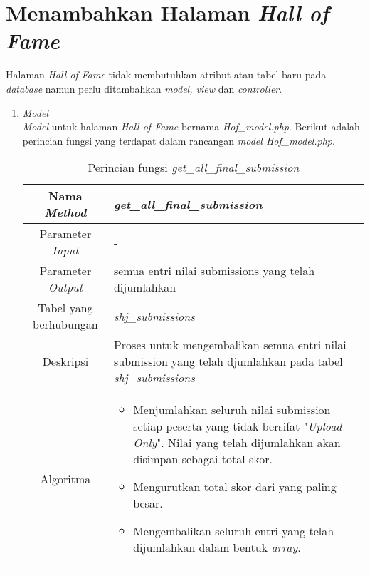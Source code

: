 \section{Menambahkan Halaman \textit{Hall of Fame}}
Halaman \textit{Hall of Fame} tidak membutuhkan atribut atau tabel baru pada \textit{database} namun perlu ditambahkan \textit{model, view} dan \textit{controller}.

\begin{enumerate}
	\item \textit{Model} \\
	\textit{Model} untuk halaman \textit{Hall of Fame} bernama \textit{Hof\_model.php}. Berikut adalah perincian fungsi yang terdapat dalam rancangan \textit{model Hof\_model.php}.
	\begin{table}[H]
		\caption{Perincian fungsi \textit{get\_all\_final\_submission}}
		\begin{tabular}{|c|p{11cm}|}
			\hline
			Nama \textit{Method} 	& 	\textit{get\_all\_final\_submission} 	\\
			\hline
			Parameter \textit{Input} & - \\
			\hline
			Parameter \textit{Output} & semua entri nilai submissions yang telah dijumlahkan \\
			\hline
			Tabel yang berhubungan & \textit{shj\_submissions} \\
			\hline
			Deskripsi	& Proses untuk mengembalikan semua entri nilai submission yang telah djumlahkan pada tabel \textit{shj\_submissions} \\
			\hline
			Algoritma	& \begin{itemize}
				\item Menjumlahkan seluruh nilai submission setiap peserta yang tidak bersifat "\textit{Upload Only}". Nilai yang telah dijumlahkan akan disimpan sebagai total skor.
				\item Mengurutkan total skor dari yang paling besar.
				\item Mengembalikan seluruh entri yang telah dijumlahkan dalam bentuk \textit{array}.
			\end{itemize} \\
			\hline
		\end{tabular}
	\end{table}
	

\end{enumerate}
